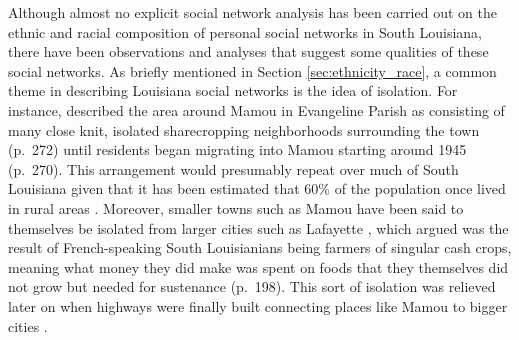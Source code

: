 \documentclass{article}\usepackage[]{graphicx}\usepackage[]{xcolor}
\begin{document}

    Although almost no explicit social network analysis has been carried out on the ethnic and racial composition of personal social networks in South Louisiana, there have been observations and analyses that suggest some qualities of these social networks.
    As briefly mentioned in Section \ref{sec:ethnicity_race}, a common theme in describing Louisiana social networks is the idea of isolation.
    For instance, \textcite{gold_french_1979} described the area around Mamou in Evangeline Parish as consisting of many close knit, isolated sharecropping neighborhoods surrounding the town (p.~272) until residents began migrating into Mamou starting around 1945 (p.~270).
    This arrangement would presumably repeat over much of South Louisiana given that it has been estimated that 60\% of the population once lived in rural areas \parencite[Bobo \& Charlton, 1974, as cited in][p.~27]{johnson_louisiana_1976}.
    Moreover, smaller towns such as Mamou have been said to themselves be isolated from larger cities such as Lafayette \parencite[p.~268]{gold_french_1979}, which \textcite{smith_influence_1939} argued was the result of French-speaking South Louisianians being farmers of singular cash crops, meaning what money they did make was spent on foods that they themselves did not grow but needed for sustenance (p.~198).
    This sort of isolation was relieved later on when highways were finally built connecting places like Mamou to bigger cities \parencite[p.~268]{gold_french_1979}.
\end{document}
